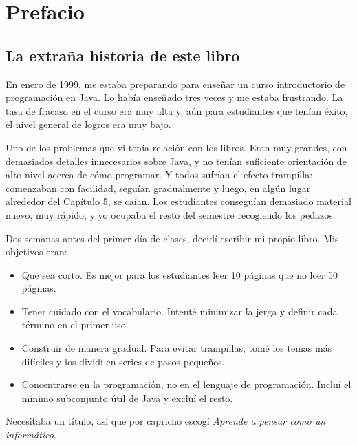 \documentclass[10pt]{book}
\begin{document}
\fi


\chapter{Prefacio}

\section*{La extraña historia de este libro}

En enero de 1999, me estaba preparando para enseñar un curso introductorio
de programación en Java.  Lo había enseñado tres veces y me estaba frustrando.
La tasa de fracaso en el curso era muy alta y, aún para estudiantes que
tenían éxito, el nivel general de logros era muy bajo.

Uno de los problemas que vi tenía relación con los libros.
Eran muy grandes, con demasiados detalles innecesarios sobre Java, y
no tenían suficiente orientación de alto nivel acerca de cómo programar.  Y todos
sufrían el efecto trampilla: comenzaban con facilidad,
seguían gradualmente y luego, en algún lugar alrededor del Capítulo 5,
se caían.  Los estudiantes conseguían demasiado material nuevo,
muy rápido, y yo ocupaba el resto del semestre recogiendo los pedazos.

Dos semanas antes del primer día de clases, decidí escribir mi propio libro.
Mis objetivos eran:

\begin{itemize}

\item Que sea corto.  Es mejor para los estudiantes leer 10 páginas que
no leer 50 páginas.

\item Tener cuidado con el vocabulario.  Intenté minimizar la jerga y
definir cada término en el primer uso.

\item Construir de manera gradual. Para evitar trampillas, tomé los temas más difíciles
y los dividí en series de pasos pequeños.

\item Concentrarse en la programación, no en el lenguaje de programación.  Incluí
el mínimo subconjunto útil de Java y excluí el resto.

\end{itemize}

Necesitaba un título, así que por capricho escogí {\em Aprende a pensar como
un informático}.
\end{document}
